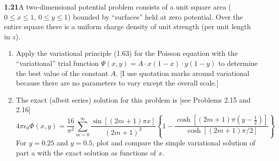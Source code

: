 \par\bigskip
\noindent\textbf{1.21}\quad A two-dimensional potential problem consists of a unit square area ($0\leq x\leq1$, $0\leq y\leq1$) bounded by ``surfaces'' held at zero potential. Over the entire square there is a uniform charge density of unit strength (per unit length in $z$).
\begin{enumerate}
\item[(a)] Apply the variational principle (1.63) for the Poisson equation with the ``variational'' trial function $\Psi(x,y)=A\cdot x(1-x)\cdot y(1-y)$ to determine the best value of the constant $A$. [I use quotation marks around variational because there are no parameters to vary except the overall scale.]
\item[(b)] The exact (albeit series) solution for this problem is [see Problems 2.15 and 2.16]
\[
4\pi\epsilon_{0}\Phi(x,y) = \frac{16}{\pi^{2}}\sum_{m=0}^{\infty}\frac{\sin[(2m+1)\pi x]}{(2m+1)^{3}}\left\{1-\frac{\cosh[(2m+1)\pi(y-\frac{1}{2})]}{\cosh[(2m+1)\pi/2]}\right\}
\]
For $y=0.25$ and $y=0.5$, plot and compare the simple variational solution of part a with the exact solution as functions of $x$.
\end{enumerate}
\solution
